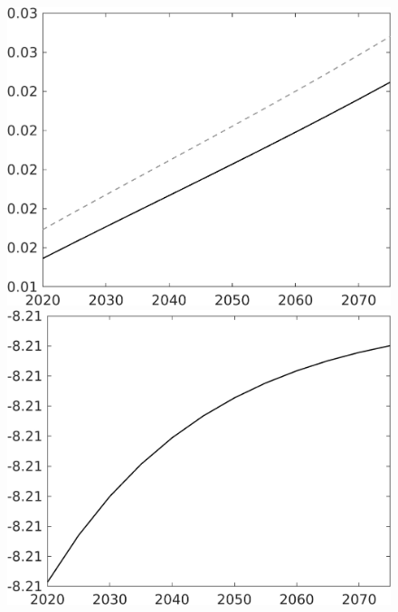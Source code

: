 \documentclass[12pt]{article}
\begin{document}
\begin{figure}[h!!]
\begin{minipage}[]{0.32\textwidth}
	\end{minipage}	
	\begin{minipage}[]{0.32\textwidth}
		\includegraphics[width=1\textwidth]{../../codding_model/own_basedOnFried/optimalPol_010922_revision/figures/all_13Sept22/CompTaul_Equlab_LFBAU_Reg0_G_spillover0_nsk0_xgr1_knspil1_sep1_countec0_GovRev0_etaa0.79_lgd0.png}
	\end{minipage}	
\begin{minipage}[]{0.32\textwidth}
\includegraphics[width=1\textwidth]{../../codding_model/own_basedOnFried/optimalPol_010922_revision/figures/all_13Sept22/CompTaul_Equlab_LFBAUPer_Reg0_F_spillover0_nsk0_xgr1_knspil1_sep1_countec0_GovRev0_etaa0.79.png}

\end{minipage}
\end{figure}
\end{document}
